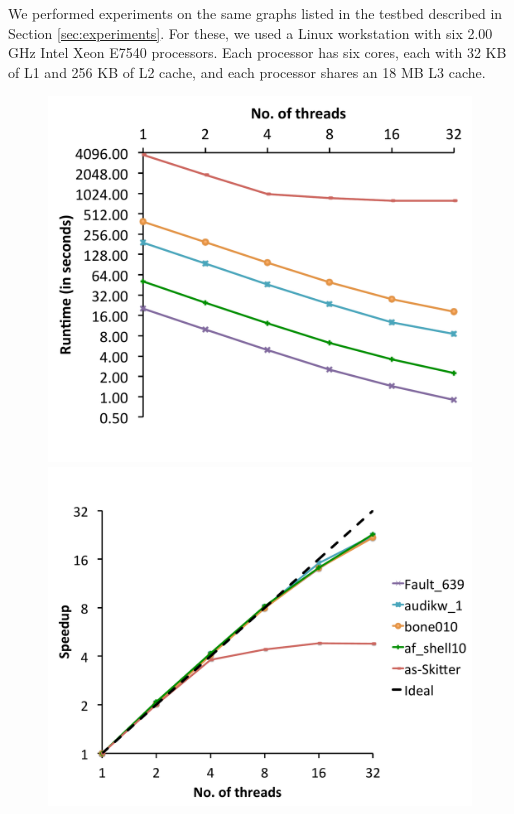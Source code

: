 We performed experiments on the same graphs listed in the testbed described in Section \ref{sec:experiments}. For these, we used a Linux workstation 
with six 2.00 GHz Intel Xeon E7540 processors. Each processor has six cores, each with 32 KB of L1 and 256 KB of L2 cache, and each processor shares an 18 MB L3 cache.  


\begin{figure}
  \centering
    \includegraphics[scale=0.21]{parallel_realworld_timing.pdf}
    \includegraphics[scale=0.21]{parallel_realworld_speedup.pdf}

\end{figure}
